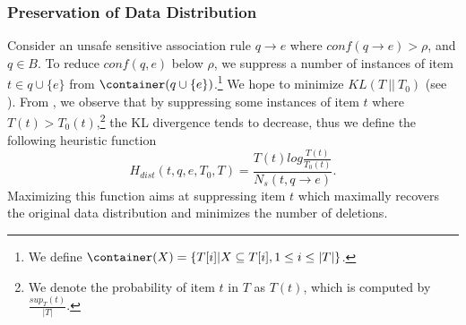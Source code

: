 \subsubsection{Preservation of Data Distribution}
Consider an unsafe sensitive association rule $q \rightarrow e$ where
$conf(q \rightarrow e) > \rho$, and $q \in B$.
To reduce $conf(q,e)$ below $\rho$,
we suppress a number of instances of item $t\in q \cup \{e\}$ from
$\container(q\cup \{e\})$.\footnote{We define $\container(X)=\{T[i]|X\subseteq T[i], 1\le i\le |T|\}$.} We hope to minimize $KL(T ~||~ T_0)$
(see ).
From , we observe that by suppressing some instances of item $t$
where $T(t)>T_0(t)$,\footnote{We denote the probability of item $t$ in $T$
as $T(t)$, which is computed by $\frac{sup_T(t)}{|T|}$.}
the KL divergence tends to decrease, thus we define
the following heuristic function
\begin{equation}\label{eq:hdist}
H_{dist}(t, q, e, T_0, T) =
	\frac{T(t)log\frac{T(t)}{T_0(t)}}{N_s(t, q\rightarrow e)}.
\end{equation}
Maximizing this function aims at
suppressing item $t$ which maximally recovers the original
data distribution and minimizes the number of deletions.

